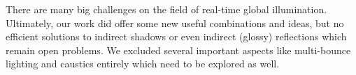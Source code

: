 \documentclass[thesis.tex]{subfiles}
\begin{document}
There are many big challenges on the field of real-time global illumination.
Ultimately, our work did offer some new useful combinations and ideas, but no efficient solutions to indirect shadows or even indirect (glossy) reflections which remain open problems.
We excluded several important aspects like multi-bounce lighting and caustics entirely which need to be explored as well.


\subfilebib %
\end{document}
